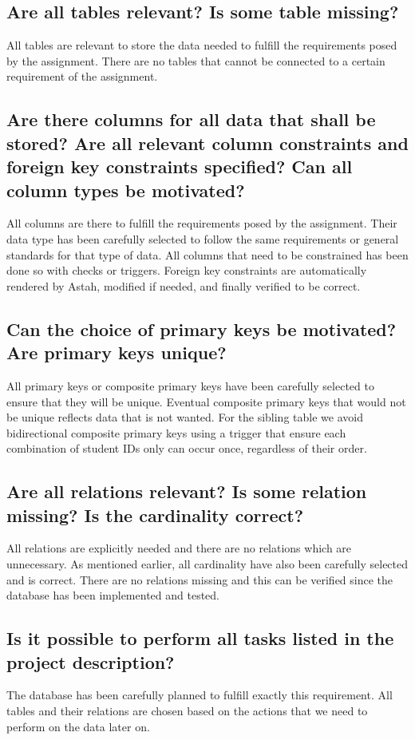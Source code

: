 \documentclass[a4paper]{scrartcl}
\begin{document}
\subsection{Are all tables relevant? Is some table missing?}
All tables are relevant to store the data needed to fulfill the requirements posed by the assignment. There are no tables that cannot be connected to a certain requirement of the assignment.


\subsection{Are there columns for all data that shall be stored? Are all relevant column constraints and foreign key constraints specified? Can all column types be motivated?}
All columns are there to fulfill the requirements posed by the assignment. Their data type has been carefully selected to follow the same requirements or general standards for that type of data. All columns that need to be constrained has been done so with checks or triggers. Foreign key constraints are automatically rendered by Astah, modified if needed, and finally verified to be correct.

\subsection{Can the choice of primary keys be motivated? Are primary keys unique?} All primary keys or composite primary keys have been carefully selected to ensure that they will be unique. Eventual composite primary keys that would not be unique reflects data that is not wanted. For the sibling table we avoid bidirectional composite primary keys using a trigger that ensure each combination of student IDs only can occur once, regardless of their order.


\subsection{Are all relations relevant? Is some relation missing? Is the cardinality correct?}
All relations are explicitly needed and there are no relations which are unnecessary. As mentioned earlier, all cardinality have also been carefully selected and is correct. There are no relations missing and this can be verified since the database has been implemented and tested.

\subsection{Is it possible to perform all tasks listed in the project description?}
The database has been carefully planned to fulfill exactly this requirement. All tables and their relations are chosen based on the actions that we need to perform on the data later on.
\end{document}
